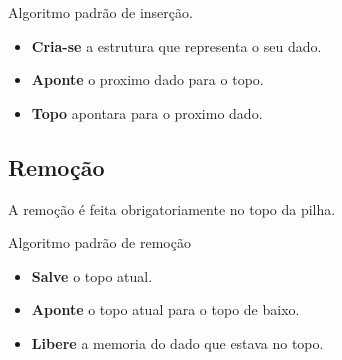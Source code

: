 \documentclass[12pt, onecolumn]{article}
\begin{document}
			Algoritmo padrão de inserção. 

			\begin{itemize}
				\item {\bf Cria-se} a estrutura que representa o seu dado.
				\item {\bf Aponte} o proximo dado para o topo.
				\item {\bf Topo } apontara para o proximo dado.
			\end{itemize}

		\subsection{Remoção}
			A remoção é feita obrigatoriamente no topo da pilha.

			Algoritmo padrão de remoção

			\begin{itemize}
				\item {\bf Salve} o topo atual.
				\item {\bf Aponte} o topo atual para o topo de baixo.
				\item {\bf Libere} a memoria do dado que estava no topo.
			\end{itemize}
\end{document}
